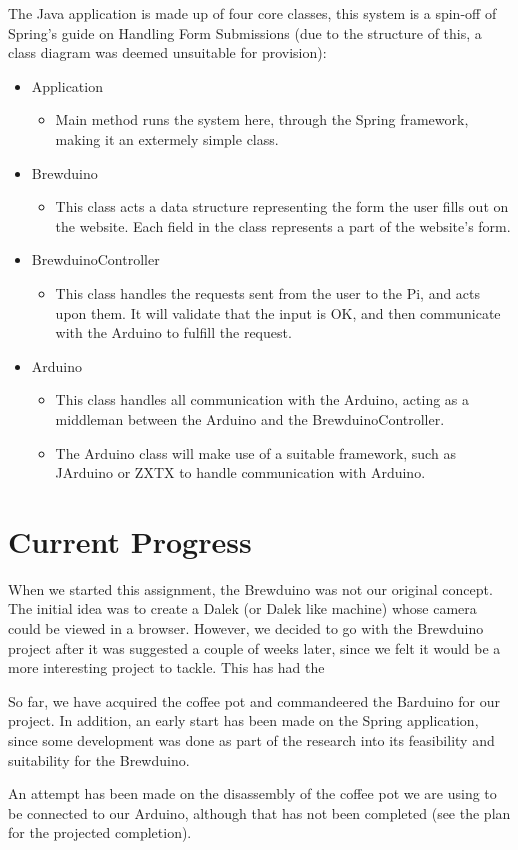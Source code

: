 \documentclass[12pt, a4paper]{article}
\begin{document}
The Java application is made up of four core classes, this system is a spin-off
of Spring's guide on Handling Form Submissions\cite{SpringGuide} (due to the
structure of this, a class diagram was deemed unsuitable for provision):
\begin{itemize}
	\item Application
	\begin{itemize}
		\item Main method runs the system here, through the Spring framework,
		making it an extermely simple class.
	\end{itemize}
	\item Brewduino
	\begin{itemize}
		\item This class acts a data structure representing the form the user
		fills out on the website. Each field in the class represents a part of
		the website's form.
	\end{itemize}
	\item BrewduinoController
	\begin{itemize}
		\item This class handles the requests sent from the user to the Pi, and
		acts upon them. It will validate that the input is OK, and then
		communicate with the Arduino to fulfill the request.
	\end{itemize}
	\item Arduino
	\begin{itemize}
		\item This class handles all communication with the Arduino, acting as a
		middleman between the Arduino and the BrewduinoController.
		\item The Arduino class will make use of a suitable framework, such as
		JArduino\cite{JArduino} or ZXTX\cite{RXTX} to handle communication with
		Arduino.
	\end{itemize}
\end{itemize}
\newpage


\section{Current Progress}
When we started this assignment, the Brewduino was not our original concept. The
initial idea was to create a Dalek (or Dalek like machine) whose camera could be
viewed in a browser. However, we decided to go with the Brewduino project after
it was suggested a couple of weeks later, since we felt it would be a more
interesting project to tackle. This has had the

So far, we have acquired the coffee pot and commandeered the Barduino for our
project. In addition, an early start has been made on the Spring application,
since some development was done as part of the research into its feasibility and
suitability for the Brewduino.

An attempt has been made on the disassembly of the coffee pot we are using to be
connected to our Arduino, although that has not been completed (see the plan for
the projected completion).


\newpage


 
\end{document}
